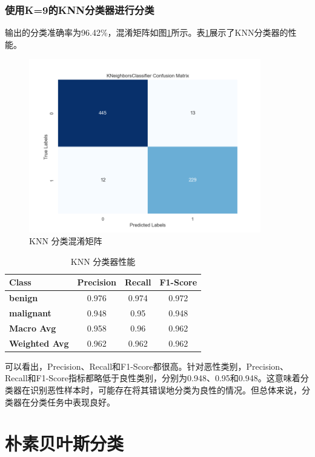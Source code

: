 \documentclass[a4paper,12pt,onecolumn,oneside]{article}
\begin{document}
\subsubsection{使用K=9的KNN分类器进行分类}
输出的分类准确率为96.42\%，混淆矩阵如图\ref{fig:knn}所示。表\ref{tbl:knn}展示了KNN分类器的性能。\par 
\begin{figure}[H]
	\centering
	\includegraphics[width=0.9\textwidth]{res3/knn.png}
	\caption{KNN 分类混淆矩阵}
	\label{fig:knn}
\end{figure}
\begin{table}[H]
	\centering
	\begin{tabular}{lccc}
		\toprule
		\textbf{Class} & \textbf{Precision} & \textbf{Recall} & \textbf{F1-Score} \\
		\midrule
		\textbf{benign} & 0.976 & 0.974 & 0.972 \\
		\textbf{malignant} & 0.948 & 0.95 & 0.948 \\
		\midrule
		\textbf{Macro Avg} & 0.958 & 0.96 & 0.962 \\
		\textbf{Weighted Avg} & 0.962 & 0.962 & 0.962 \\
		\bottomrule
	\end{tabular}
	\caption{KNN 分类器性能}
	\label{tbl:knn}
\end{table}
可以看出，Precision、Recall和F1-Score都很高。针对恶性类别，Precision、Recall和F1-Score指标都略低于良性类别，分别为0.948、0.95和0.948。这意味着分类器在识别恶性样本时，可能存在将其错误地分类为良性的情况。但总体来说，分类器在分类任务中表现良好。
\clearpage
\section{朴素贝叶斯分类}
\end{document}
